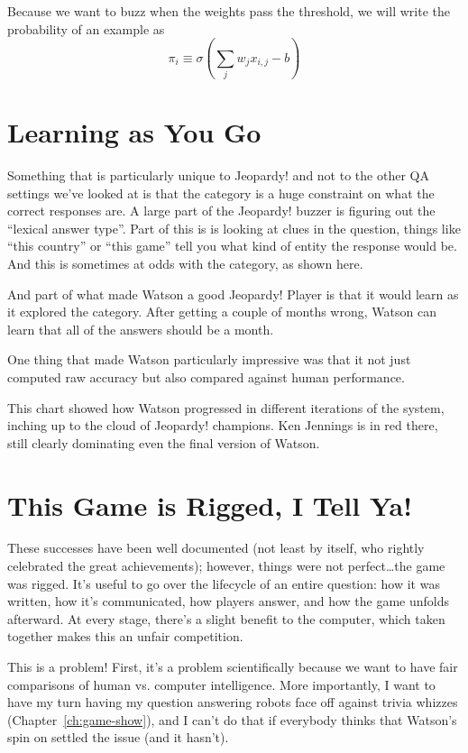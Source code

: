 Because we want to buzz when the weights pass the threshold, we will write the
probability of an example as
\begin{equation}
  \pi_i \equiv \sigma \left( \sum_j w_{j} x_{i,j} - b \right)
\end{equation}

\section{Learning as You Go}

Something that is particularly unique to Jeopardy! and not to the
other QA settings we’ve looked at is that the category is a huge
constraint on what the correct responses are.  A large part of the
Jeopardy! buzzer is figuring out the “lexical answer type”.  Part of
this is is looking at clues in the question, things like “this
country” or “this game” tell you what kind of entity the response
would be.  And this is sometimes at odds with the category, as shown
here.


And part of what made Watson a good Jeopardy! Player is that it would learn as it explored the category.  After getting a couple of months wrong, Watson can learn that all of the answers should be a month.

One thing that made Watson particularly impressive was that it not just computed raw accuracy but also compared against human performance.  

This chart showed how Watson progressed in different iterations of the system, inching up to the cloud of Jeopardy! champions.  Ken Jennings is in red there, still clearly dominating even the final version of Watson.

\section{This Game is Rigged, I Tell Ya!}

These successes have been well documented (not least by 
itself, who rightly celebrated the great achievements); however,
things were not perfect\dots the game was rigged.
%
It's useful to go over the lifecycle of an entire question: how it was
written, how it's communicated, how players answer, and how the game
unfolds afterward.
%
At every stage, there's a slight benefit to the computer, which taken
together makes this an unfair competition.

This is a problem!  First, it's a problem scientifically because we
want to have fair comparisons of human vs. computer intelligence.
%
More importantly, I want to have my turn having my question answering
robots face off against trivia whizzes (Chapter~\ref{ch:game-show}),
and I can't do that if everybody thinks that Watson's spin
on \jeopardy{} settled the issue (and it hasn't).

